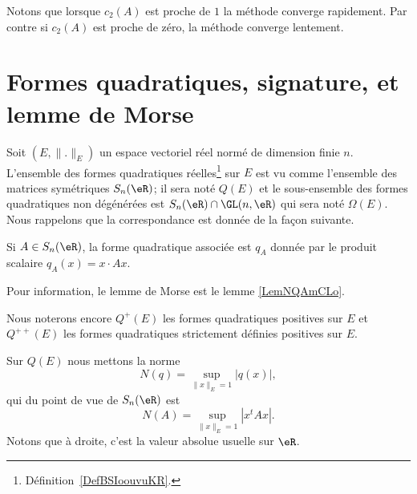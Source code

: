 Notons que lorsque \( c_2(A)\) est proche de \( 1\) la méthode converge rapidement. Par contre si \( c_2(A)\) est proche de zéro, la méthode converge lentement.

\section{Formes quadratiques, signature, et lemme de Morse}

\begin{normaltext}      \label{NORMooHSWKooLtUbRl}
	Soit \( (E,\| . \|_E)\) un espace vectoriel réel normé de dimension finie \( n\). L'ensemble des formes quadratiques réelles\footnote{Définition~\ref{DefBSIoouvuKR}.} sur \( E\) est vu comme l'ensemble des matrices symétriques \( S_n(\eR)\); il sera noté \( Q(E)\) et le sous-ensemble des formes quadratiques non dégénérées est \( S_n(\eR)\cap\GL(n,\eR)\) qui sera noté \( \Omega(E)\). Nous rappelons que la correspondance est donnée de la façon suivante.

	Si \( A\in S_n(\eR)\), la forme quadratique associée est \( q_A\) donnée par le produit scalaire \( q_A(x)=x\cdot Ax\).

	Pour information, le lemme de Morse est le lemme \ref{LemNQAmCLo}.
\end{normaltext}

\begin{normaltext}      \label{NORMooQZFLooYnILtn}
	Nous noterons encore \( Q^+(E)\) les formes quadratiques positives sur \( E\) et \( Q^{++}(E)\) les formes quadratiques strictement définies positives sur \( E\).
\end{normaltext}

Sur \( Q(E)\) nous mettons la norme
\begin{equation}
	N(q)=\sup_{\| x \|_E=1}| q(x) |,
\end{equation}
qui du point de vue de \( S_n(\eR)\) est
\begin{equation}    \label{EqDOgBNAg}
	N(A)=\sup_{\| x \|_E=1}| x^tAx |.
\end{equation}
Notons que à droite, c'est la valeur absolue usuelle sur \( \eR\).


